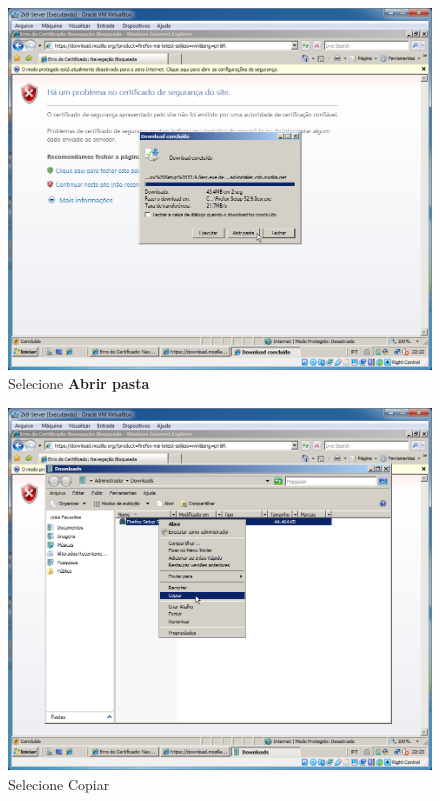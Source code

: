 \documentclass[10pt]{article}
\begin{document}
\begin{figure}[H]
    \centering
    \caption{Selecione \textbf{Abrir pasta}}
    \label{fig:re063}
    \includegraphics[width=\linewidth]{images/rede_externa/re063.png}
\end{figure}
\begin{figure}[H]
    \centering
    \caption{Selecione Copiar}
    \label{fig:re064}
    \includegraphics[width=\linewidth]{images/rede_externa/re064.png}
\end{figure}
\end{document}

